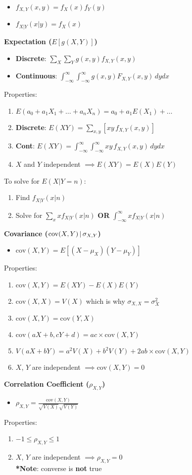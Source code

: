 \documentclass[a4paper, 12pt]{article}
\begin{document}
\begin{multicols*}{4}
\begin{itemize}
    \item $f_{X,Y}(x,y) = f_X(x)f_Y(y)$
    \item $f_{X|Y}(x|y) = f_X(x)$
\end{itemize}
\textbf{Expectation ($E[g(X,Y)]$)}
\begin{itemize}
    \item \textbf{Discrete}: $\sum_X\sum_Yg(x,y)f_{X,Y}(x,y)$
    \item \textbf{Continuous}: $\int_{-\infty}^{\infty}\int_{-\infty}^{\infty} g(x,y)F_{X,Y}(x,y) \, dydx$
\end{itemize}
Properties:
\begin{enumerate}
    \item $E(a_0 + a_1X_1 + \dots + a_nX_n) = a_0 + a_1E(X_1) + \dots$
    \item \textbf{Discrete}: $E(XY) = \sum_{x,y}[xy \, f_{X,Y}(x,y)]$
    \item \textbf{Cont}: $E(XY) = \int_{-\infty}^{\infty}\int_{-\infty}^{\infty}xy \, f_{X,Y}(x,y) \, dydx$
    \item $X$ and $Y$ independent $\implies E(XY) = E(X)E(Y)$
\end{enumerate}
To solve for $E(X|Y = n)$:
\begin{enumerate}
    \item Find $f_{X|Y}(x|n)$
    \item Solve for $\sum_xxf_{X|Y}(x|n)$ \textbf{OR} $\int_{-\infty}^{\infty}xf_{X|Y}(x|n)$
\end{enumerate}
\textbf{Covariance ($\textnormal{cov}(X,Y) \,|\, \sigma_{X,Y}$)}
\begin{itemize}
    \item $\text{cov}(X,Y) = E[(X-\mu_X)(Y-\mu_Y)]$
\end{itemize}
Properties:
\begin{enumerate}
    \item $\text{cov}(X,Y) = E(XY) - E(X)E(Y)$
    \item $\text{cov}(X,X) = V(X)$ which is why $\sigma_{X,X} = \sigma^2_{X}$
    \item $\text{cov}(X,Y) = \text{cov}(Y,X)$
    \item $\text{cov}(aX + b, cY + d) = ac \times \text{cov}(X,Y)$
    \item $V(aX + bY) = a^2V(X) + b^2V(Y) + 2ab\times \text{cov}(X,Y)$
    \item $X$, $Y$ are independent $\implies \text{cov}(X,Y) = 0$
\end{enumerate}
\textbf{Correlation Coefficient ($\rho_{X,Y}$)}
\begin{itemize}
    \item $\rho_{X,Y} = \frac{\text{cov}(X,Y)}{\sqrt{V(X)}\sqrt{V(Y)}}$
\end{itemize}
Properties:
\begin{enumerate}
    \item $-1 \leq \rho_{X,Y} \leq 1$
    \item $X$, $Y$ are independent $\implies \rho_{X,Y} = 0$ \\ 
        \textbf{*Note}: converse is \textbf{not} true
\end{enumerate}


\end{multicols*}
\end{document}
